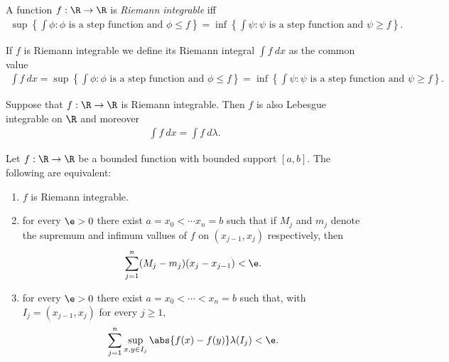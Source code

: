 \documentclass{article}
\begin{document}
\begin{theorem}[Notes 4.5]
	A function $f:\R\to\R$ is \emph{Riemann integrable} iff
	\begin{align*}
		\sup\left\lbrace\int\phi : \phi\text{ is a step function and }\phi\leq f\right\rbrace
		= \inf\left\lbrace\int\psi : \psi\text{ is a step function and }\psi \geq f\right\rbrace.
	\end{align*}
\end{theorem}

\begin{definition}
	If $f$ is Riemann integrable we define its Riemann integral $\int f\:dx$ as the common
	value
	\begin{align*}
		\int f\: dx
		=\sup\left\lbrace\int\phi : \phi\text{ is a step function and }\phi\leq f\right\rbrace
		= \inf\left\lbrace\int\psi : \psi\text{ is a step function and }\psi \geq f\right\rbrace.
	\end{align*}
\end{definition}

\begin{theorem}[Notes 4.6]
	Suppose that $f:\R\to\R$ is Riemann integrable. Then $f$ is also Lebesgue integrable on $\R$
	and moreover
	\begin{align*}
		\int f\:dx = \int f\:d\lambda.
	\end{align*}
\end{theorem}

\begin{lemma}[Notes 4.1]
	Let $f:\R\to\R$ be a bounded function with bounded support $[a,b]$. The following are equivalent:
	\begin{enumerate}
		\item $f$ is Riemann integrable.
		\item for every $\e>0$ there exist $a=x_0<\cdots x_n=b$ such that if $M_j$ and $m_j$
		      denote the supremum and infimum vallues of $f$ on $(x_{j-1}, x_j)$ respectively, then \begin{align*}
			      \sum_{j=1}^n (M_j-m_j)(x_j-x_{j-1})<\e.
		      \end{align*}
		\item for every $\e>0$ there exist $a=x_0<\cdots<x_n=b$ such that, with $I_j=(x_{j-1},x_j)$
		      for every $j\geq 1$, \begin{align*}
			      \sum_{j=1}^n \sup_{x,y\in I_j} \abs{f(x)-f(y)}\lambda(I_j)<\e.
		      \end{align*}
	\end{enumerate}
\end{lemma}
\end{document}
